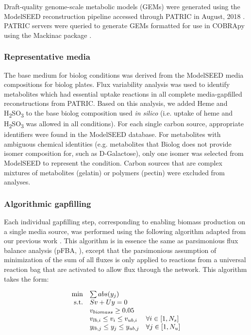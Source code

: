 \documentclass[11pt,twocolumn,notitlepage,openany,twoside]{book}
\begin{document}
\begin{refsection}
Draft-quality genome-scale metabolic models (GEMs) were generated using the ModelSEED reconstruction pipeline \cite{Henry2010-um} accessed through PATRIC in August, 2018 \cite{Wattam2017-tk}. PATRIC servers were queried to generate GEMs formatted for use in COBRApy \cite{Ebrahim2013-eb} using the Mackinac package \cite{Mundy2017-eb}.

\subsubsection{Representative media}

The base medium for biolog conditions was derived from the ModelSEED media compositions for biolog plates. Flux variability analysis was used to identify metabolites which had essential uptake reactions in all complete media-gapfilled reconstructions from PATRIC. Based on this analysis, we added Heme and H\textsubscript{2}SO\textsubscript{3} to the base biolog composition used \textit{in silico} (i.e. uptake of heme and H\textsubscript{2}SO\textsubscript{3} was allowed in all conditions). For each single carbon source, appropriate identifiers were found in the ModelSEED database. For metabolites with ambiguous chemical identities (e.g. metabolites that Biolog does not provide isomer composition for, such as D-Galactose), only one isomer was selected from ModelSEED to represent the condition. Carbon sources that are complex mixtures of metabolites (gelatin) or polymers (pectin) were excluded from analyses.

\subsubsection{Algorithmic gapfilling}

Each individual gapfilling step, corresponding to enabling biomass production on a single media source, was performed using the following algorithm adapted from our previous work \cite{Biggs2017-md}. This algorithm is in essence the same as parsimonious flux balance analysis (pFBA, \cite{Lewis2010-xs}), except that the parsimonious assumption of minimization of the sum of all fluxes is only applied to reactions from a universal reaction bag that are activated to allow flux through the network. This algorithm takes the form:

\begin{equation*}
\begin{array}{rlll}
\min & \multicolumn{2}{l} {\sum abs(y_j) } \\
\textrm{s.t.} &	Sv + Uy = 0	 \\
&	v_{biomass} \geq 0.05 \\
&	v_{lb,i} \leq v_i \leq v_{ub,i}	& 	\forall i \in [1, N_s] \\
&	y_{lb,j} \leq y_j \leq y_{ub,j}	&	\forall j \in [1, N_u] \\
\end{array}
\end{equation*}


\end{refsection}
\end{document}
